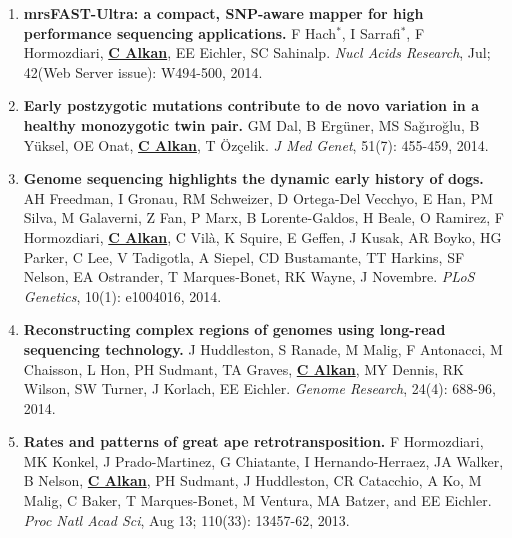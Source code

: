 \begin{enumerate}
       
       
  \item        
  {\bf mrsFAST-Ultra: a compact, SNP-aware mapper for high performance sequencing applications.}
    F Hach$^*$,
    I Sarrafi$^*$,
    F Hormozdiari,
    {\bf {\underline {C Alkan}}},
    EE Eichler,   SC Sahinalp.
    {\em Nucl Acids Research}, Jul; 42(Web Server issue): W494-500, 2014.

  \item        
         {\bf Early postzygotic mutations contribute to de novo variation in a healthy monozygotic twin pair.}
         GM Dal, B Ergüner, MS Sağıroğlu, B Yüksel, OE Onat, {\bf {\underline {C Alkan}}}, T Özçelik. 
         {\em J Med Genet}, 51(7): 455-459, 2014.

  
  \item        
         {\bf Genome sequencing highlights the dynamic early history of dogs.} 
         AH Freedman, I Gronau, RM Schweizer, D Ortega-Del Vecchyo, E Han, PM Silva, 
         M Galaverni, Z Fan, P Marx, B Lorente-Galdos, H Beale, O Ramirez, F Hormozdiari, 
         {\bf {\underline {C Alkan}}}, 
         C Vilà, K Squire, E Geffen, J Kusak, AR Boyko, HG Parker, 
         C Lee, V Tadigotla, A Siepel, CD Bustamante, TT Harkins, SF Nelson, 
         EA Ostrander, T Marques-Bonet, RK Wayne, J Novembre. 
         {\em PLoS Genetics}, 10(1): e1004016, 2014.


 \item        
        {\bf Reconstructing complex regions of genomes using long-read sequencing technology.}
         J Huddleston, S Ranade, M Malig, F Antonacci, M Chaisson, L Hon, PH Sudmant, TA Graves, 
         {\bf {\underline{C Alkan}}}, MY Dennis, RK Wilson, SW Turner, J Korlach, EE Eichler. 
         {\em Genome Research},  24(4): 688-96, 2014.


 \item        
        {\bf Rates and patterns of great ape retrotransposition.}
        F Hormozdiari, MK Konkel, J Prado-Martinez, G Chiatante, I Hernando-Herraez, JA Walker, B Nelson, {\bf {\underline {C Alkan}}}, PH Sudmant, J Huddleston, CR Catacchio, A Ko, 
        M Malig, C Baker, T Marques-Bonet, M Ventura, MA Batzer, and EE Eichler. 
        {\em Proc Natl Acad Sci}, Aug 13; 110(33): 13457-62, 2013.
                             


\end{enumerate}
